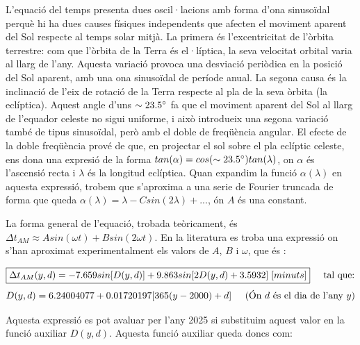 \documentclass[a4paper, 11pt]{article}
\begin{document}
\vspace{2mm}

\noindent L’equació del temps presenta dues oscil·lacions amb forma d’ona sinusoïdal perquè hi ha dues causes físiques independents que afecten el moviment aparent del Sol respecte al temps solar mitjà. La primera és l’excentricitat de l’òrbita terrestre: com que l’òrbita de la Terra és el·líptica, la seva velocitat orbital varia al llarg de l’any. Aquesta variació provoca una desviació periòdica en la posició del Sol aparent, amb una ona sinusoïdal de període anual. La segona causa és la inclinació de l’eix de rotació de la Terra respecte al pla de la seva òrbita (la eclíptica). Aquest angle d’uns $\sim 23.5\degree$ fa que el moviment aparent del Sol al llarg de l’equador celeste no sigui uniforme, i això introdueix una segona variació també de tipus sinusoïdal, però amb el doble de freqüència angular. El efecte de la doble freqüència prové de que, en projectar el sol sobre el pla eclíptic celeste, ens dona una expresió de la forma $tan(\alpha) = cos(\sim 23.5 \degree) tan(\lambda)$, on $\alpha$ és l'ascensió recta i $\lambda$ és la longitud eclíptica. Quan expandim la funció $\alpha(\lambda)$ en aquesta expressió, trobem que s'aproxima a una serie de Fourier truncada de forma que queda $\alpha(\lambda) = \lambda - Csin(2\lambda) + ...$, ón $A$ és una constant.

\vspace{2mm}

\noindent La forma general de l'equació, trobada teòricament, és $\Delta t_{AM} \approx Asin(\omega t) + Bsin(2\omega t)$. En la literatura es troba una expressió on s'han aproximat experimentalment els valors de $A$, $B$ i $\omega$, que és \cite{EQ_OF_TIME}:

\begin{equation} \label{eq_time}
    \boxed{\Delta t_{AM}(y,d) = -7.659sin[D(y,d)] + 9.863 sin[2D(y,d) + 3.5932] \hspace{1mm} [minuts]} \hspace{5mm} \text{tal que:}
\end{equation}
\begin{equation*}
    D(y,d) = 6.24004077 + 0.01720197[365(y-2000) + d] \hspace{5mm} \text{(Ón $d$ és el dia de l'any $y$)}
\end{equation*}
\vspace{2mm}

\noindent Aquesta expressió es pot avaluar per l'any 2025 si substituim aquest valor en la funció auxiliar $D(y,d)$. Aquesta funció auxiliar queda doncs com:
\end{document}
